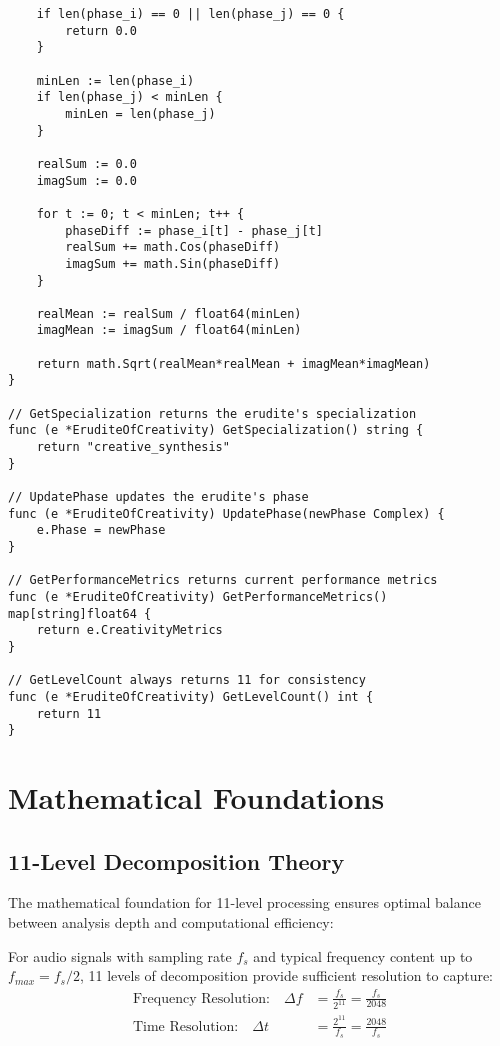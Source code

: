 \begin{tcolorbox}[colback=CodeBackground, colframe=DarkGray, title=Erudite of Creativity Implementation, fonttitle=\bfseries]
\begin{verbatim}
    if len(phase_i) == 0 || len(phase_j) == 0 {
        return 0.0
    }
    
    minLen := len(phase_i)
    if len(phase_j) < minLen {
        minLen = len(phase_j)
    }
    
    realSum := 0.0
    imagSum := 0.0
    
    for t := 0; t < minLen; t++ {
        phaseDiff := phase_i[t] - phase_j[t]
        realSum += math.Cos(phaseDiff)
        imagSum += math.Sin(phaseDiff)
    }
    
    realMean := realSum / float64(minLen)
    imagMean := imagSum / float64(minLen)
    
    return math.Sqrt(realMean*realMean + imagMean*imagMean)
}

// GetSpecialization returns the erudite's specialization
func (e *EruditeOfCreativity) GetSpecialization() string {
    return "creative_synthesis"
}

// UpdatePhase updates the erudite's phase
func (e *EruditeOfCreativity) UpdatePhase(newPhase Complex) {
    e.Phase = newPhase
}

// GetPerformanceMetrics returns current performance metrics
func (e *EruditeOfCreativity) GetPerformanceMetrics() map[string]float64 {
    return e.CreativityMetrics
}

// GetLevelCount always returns 11 for consistency
func (e *EruditeOfCreativity) GetLevelCount() int {
    return 11
}
\end{verbatim}
\end{tcolorbox}

\section{Mathematical Foundations}

\subsection{11-Level Decomposition Theory}

The mathematical foundation for 11-level processing ensures optimal balance between analysis depth and computational efficiency:

\begin{theorem}
For audio signals with sampling rate $f_s$ and typical frequency content up to $f_{max} = f_s/2$, 11 levels of decomposition provide sufficient resolution to capture:
\begin{align}
\text{Frequency Resolution:} \quad \Delta f &= \frac{f_s}{2^{11}} = \frac{f_s}{2048} \\
\text{Time Resolution:} \quad \Delta t &= \frac{2^{11}}{f_s} = \frac{2048}{f_s}
\end{align}
\end{theorem}

